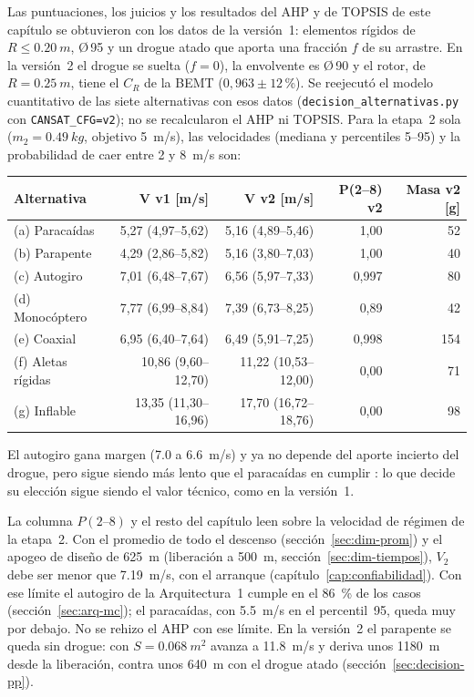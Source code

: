 \begin{nota}
Las puntuaciones, los juicios y los resultados del AHP y de TOPSIS de este capítulo se obtuvieron con los datos de la versión~1:
elementos rígidos de $R\le\SI{0.20}{m}$, Ø\,95 y un drogue atado que aporta una fracción $f$ de su arrastre. En la versión~2 el drogue se suelta
($f=0$), la envolvente es Ø\,90 y el rotor, de $R=\SI{0.25}{m}$, tiene el $C_R$ de la BEMT ($0{,}963\pm12$\,\%). Se reejecutó el modelo cuantitativo de
las siete alternativas con esos datos (\texttt{decision\_alternativas.py} con \texttt{CANSAT\_CFG=v2}); no se recalcularon el AHP ni TOPSIS.
Para la etapa~2 sola ($m_2=\SI{0.49}{kg}$, objetivo \SI{5}{m/s}), las velocidades (mediana y percentiles 5--95) y la probabilidad de
caer entre 2 y \SI{8}{m/s} son:

\begin{center}\small
\begin{tabular}{@{}lrrrr@{}}
\toprule
\textbf{Alternativa} & \textbf{V v1} [m/s] & \textbf{V v2} [m/s] & \textbf{P(2--8) v2} & \textbf{Masa v2} [g]\\\midrule
(a) Paracaídas & 5,27 (4,97--5,62) & 5,16 (4,89--5,46) & 1,00 & 52\\
(b) Parapente & 4,29 (2,86--5,82) & 5,16 (3,80--7,03) & 1,00 & 40\\
(c) Autogiro & 7,01 (6,48--7,67) & 6,56 (5,97--7,33) & 0,997 & 80\\
(d) Monocóptero & 7,77 (6,99--8,84) & 7,39 (6,73--8,25) & 0,89 & 42\\
(e) Coaxial & 6,95 (6,40--7,64) & 6,49 (5,91--7,25) & 0,998 & 154\\
(f) Aletas rígidas & 10,86 (9,60--12,70) & 11,22 (10,53--12,00) & 0,00 & 71\\
(g) Inflable & 13,35 (11,30--16,96) & 17,70 (16,72--18,76) & 0,00 & 98\\
\bottomrule
\end{tabular}
\end{center}

El autogiro gana margen (\SI{7.0}{} a \SI{6.6}{m/s}) y ya no depende del aporte incierto del drogue, pero sigue siendo más lento que el
paracaídas en cumplir : lo que decide su elección sigue siendo el valor técnico, como en la versión~1.

La columna $P(2\text{--}8)$ y el resto del capítulo leen  sobre la velocidad de régimen de la etapa~2. Con el promedio de todo
el descenso (sección~\ref{sec:dim-prom}) y el apogeo de diseño de \SI{625}{m} (liberación a \SI{500}{m}, sección~\ref{sec:dim-tiempos}),
$V_2$ debe ser menor que \SI{7.19}{m/s}, con el arranque (capítulo~\ref{cap:confiabilidad}). Con ese límite el autogiro de la Arquitectura~1
cumple en el \SI{86}{\percent} de los casos (sección~\ref{sec:arq-mc}); el paracaídas, con \SI{5.5}{m/s} en el percentil~95, queda muy por
debajo. No se rehizo el AHP con ese límite. En la versión~2 el parapente se queda sin drogue: con $S=\SI{0.068}{m^2}$ avanza a \SI{11.8}{m/s} y deriva
unos \SI{1180}{m} desde la liberación, contra unos \SI{640}{m} con el drogue atado (sección~\ref{sec:decision-pp}).


\end{nota}
